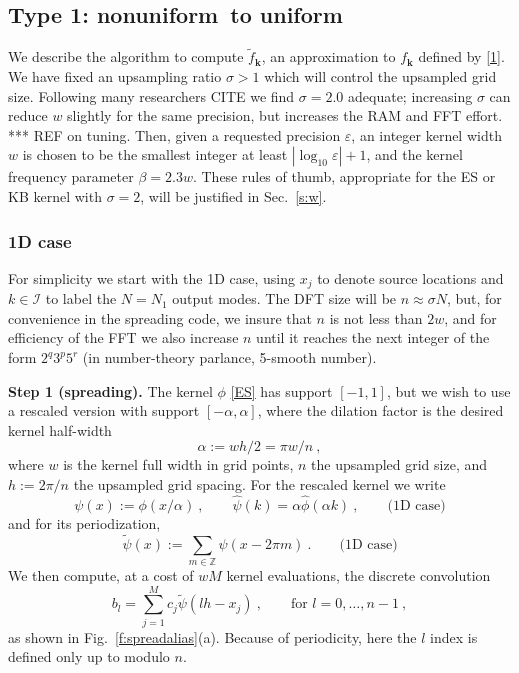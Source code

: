\documentclass[10pt]{article}
\newcommand{\be}{\begin{equation}}
\newcommand{\ee}{\end{equation}}
\newcommand{\mbf}[1]{{\mathbf #1}}
\newcommand{\ZZ}{\mathbb{Z}}
\newcommand{\eps}{\varepsilon}
\newcommand{\bigO}{{\mathcal O}}
\newcommand{\kk}{\mbf{k}}
\newcommand{\KK}{{\mathcal I}}     %
\newcommand{\freq}{\beta}          %
\newcommand{\rat}{\sigma}          %
\newcommand{\ppsi}{{\tilde\psi}}   %
\newcommand{\al}{\alpha}           %
\newcommand{\NU}{{nonuniform}}       %
\newcommand{\U}{{uniform}}
\begin{document}
\subsection{Type 1: \NU\ to \U}
\label{s:type1}

We describe the algorithm to compute $\tilde f_\kk$, an approximation
to $f_\kk$ defined by \eqref{1}.
We have fixed an upsampling ratio $\rat>1$ which will control the
upsampled grid size.
Following many researchers CITE we find $\rat=2.0$ adequate;
increasing $\rat$ can reduce $w$ slightly for the same precision,
but increases the RAM and FFT effort.
*** REF on tuning.
Then, given a requested precision $\eps$,
an integer kernel width $w$ is chosen
to be the smallest integer at least $|\log_{10} \eps| + 1$,
and the kernel frequency parameter $\freq = 2.3 w$.
These rules of thumb, appropriate for the ES or KB kernel with
$\rat=2$, will be justified in Sec.~\ref{s:w}.

\subsubsection{1D case}
\label{s:1d1}

For simplicity we start with the 1D case, using $x_j$ to denote source
locations and $k\in\KK$ to label the $N=N_1$ output modes.
The DFT size will be $n \approx \rat N$,
but, for convenience in the spreading code, we insure that $n$
is not less than $2w$,
and for efficiency of the FFT we also increase $n$ until it reaches the next
integer of the form $2^q3^p5^r$ (in number-theory parlance, 5-smooth number).

{\bf Step 1 (spreading).}
The kernel $\phi$ \eqref{ES} has support $[-1,1]$, but we wish to
use a rescaled version with support $[-\al,\al]$, where
the dilation factor is the desired kernel half-width
\be
\alpha := wh/2 = \pi w/n
~,
\label{al}
\ee
where $w$ is the kernel full width in grid points, $n$
the upsampled grid size, and $h := 2\pi/n$ the upsampled grid spacing.
For the rescaled kernel we write
\be
\psi(x) := \phi(x/\al)~,
\qquad \hat\psi(k) = \al \hat\phi(\al k)~,
\qquad \mbox{(1D case)}
\label{psi1}
\ee
and for its periodization,
\be
\ppsi(x) := \sum_{m\in\ZZ} \psi(x-2\pi m)
~.
\qquad \mbox{(1D case)}
\label{ppsi1}
\ee
We then compute, at a cost of $wM$ kernel evaluations, %
the discrete convolution
\be
b_l = \sum_{j=1}^M c_j \ppsi(lh - x_j)
~, \qquad \mbox{for } l=0,\dots,n-1
~,
\label{bl1}
\ee
as shown in Fig.~\ref{f:spreadalias}(a).
Because of periodicity, here the $l$ index is defined only up to modulo $n$.
\end{document}
